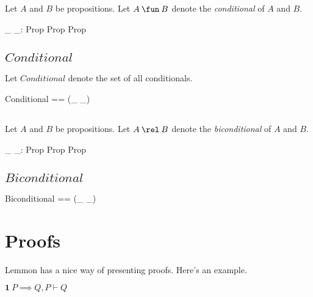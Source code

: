 \documentclass[11pt, oneside]{article}
\begin{document}
\subsection{}

Let $A$ and $B$ be propositions.
Let $A \impliesProp B$ denote the {\it conditional} of $A$ and $B$.

\begin{axdef}
	\_ \impliesProp \_: Prop \cross Prop \inj Prop
\end{axdef}

\subsection{$Conditional$}

Let $Conditional$ denote the set of all conditionals.

\begin{zed}
	Conditional == \ran (\_ \impliesProp \_)
\end{zed}

\subsection{}

Let $A$ and $B$ be propositions.
Let $A \equivProp B$ denote the {\it biconditional} of $A$ and $B$.

\begin{axdef}
	\_ \equivProp \_: Prop \cross Prop \inj Prop
\end{axdef}

\subsection{$Biconditional$}

\begin{zed}
	Biconditional == \ran (\_ \equivProp \_)
\end{zed}

\section{Proofs}

Lemmon has a nice way of presenting proofs.
Here's an example.

\vspace{1ex}

$\mathbf{1}\ P \implies Q, P \vdash Q$

\vspace{1ex}
\end{document}
